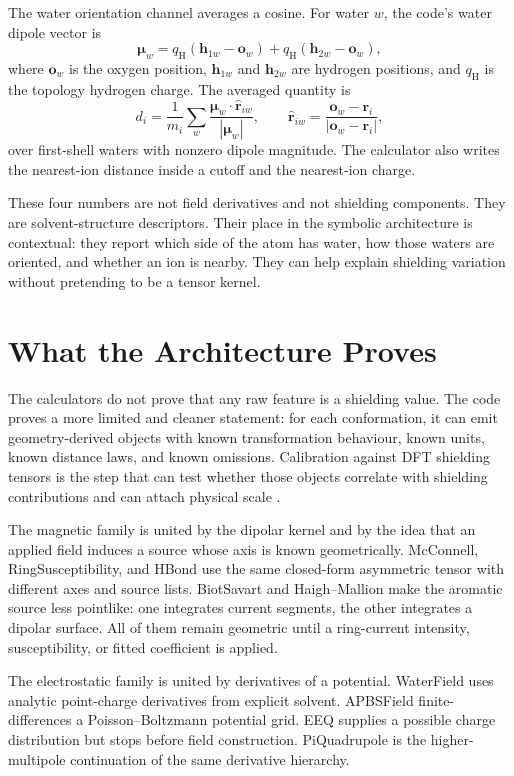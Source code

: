 \documentclass[11pt]{article}
\begin{document}
The water orientation channel averages a cosine. For water \(w\), the code's
water dipole vector is
\[
  \bm\mu_w
  =
  q_{\mathrm H}(\bm h_{1w}-\bm o_w)
  +
  q_{\mathrm H}(\bm h_{2w}-\bm o_w),
\]
where \(\bm o_w\) is the oxygen position, \(\bm h_{1w}\) and \(\bm h_{2w}\)
are hydrogen positions, and \(q_{\mathrm H}\) is the topology hydrogen charge.
The averaged quantity is
\[
  d_i=
  \frac{1}{m_i}
  \sum_w
  \frac{\bm\mu_w\cdot\hat{\bm r}_{iw}}{|\bm\mu_w|},
  \qquad
  \hat{\bm r}_{iw}
  =
  \frac{\bm o_w-\bm r_i}{|\bm o_w-\bm r_i|},
\]
over first-shell waters with nonzero dipole magnitude. The calculator also
writes the nearest-ion distance inside a cutoff and the nearest-ion charge.

These four numbers are not field derivatives and not shielding components. They
are solvent-structure descriptors. Their place in the symbolic architecture is
contextual: they report which side of the atom has water, how those waters are
oriented, and whether an ion is nearby. They can help explain shielding
variation without pretending to be a tensor kernel.

\section{What the Architecture Proves}

The calculators do not prove that any raw feature is a shielding value. The
code proves a more limited and cleaner statement: for each conformation, it can
emit geometry-derived objects with known transformation behaviour, known units,
known distance laws, and known omissions. Calibration against DFT shielding
tensors is the step that can test whether those objects correlate with
shielding contributions and can attach physical scale \cite{dedios1993}.

The magnetic family is united by the dipolar kernel and by the idea that an
applied field induces a source whose axis is known geometrically. McConnell,
RingSusceptibility, and HBond use the same closed-form asymmetric tensor with
different axes and source lists. BiotSavart and Haigh--Mallion make the aromatic
source less pointlike: one integrates current segments, the other integrates a
dipolar surface. All of them remain geometric until a ring-current intensity,
susceptibility, or fitted coefficient is applied.

The electrostatic family is united by derivatives of a potential. WaterField
uses analytic point-charge derivatives from explicit solvent. APBSField
finite-differences a Poisson--Boltzmann potential grid. EEQ supplies a possible
charge distribution but stops before field construction. PiQuadrupole is the
higher-multipole continuation of the same derivative hierarchy.
\end{document}
